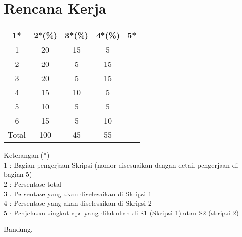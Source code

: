 \documentclass[a4paper,twoside]{article}
\begin{document}
\section{Rencana Kerja}
\begin{center}
  \begin{tabular}{ | c | c | c | c | l |}
    \hline
    1*  & 2*(\%) & 3*(\%) & 4*(\%) &5*\\ \hline \hline
    1   & 20 & 15 & 5  & {\footnotesize } \\ \hline
    2   & 20 & 5  & 15 & {\footnotesize } \\ \hline
    3   & 20 & 5  & 15 & {\footnotesize } \\ \hline
    4   & 15 & 10 & 5  & {\footnotesize } \\ \hline
    5   & 10 & 5  & 5  & {\footnotesize } \\ \hline
    6   & 15 & 5  & 10 & {\footnotesize } \\ \hline
    Total  & 100  & 45 & 55 &  \\ \hline
                          \end{tabular}
\end{center}

Keterangan (*)\\
1 : Bagian pengerjaan Skripsi (nomor disesuaikan dengan detail pengerjaan di bagian 5)\\
2 : Persentase total \\
3 : Persentase yang akan diselesaikan di Skripsi 1 \\
4 : Persentase yang akan diselesaikan di Skripsi 2 \\
5 : Penjelasan singkat apa yang dilakukan di S1 (Skripsi 1) atau S2 (skripsi 2)

\vspace{1cm}
\centering Bandung, \tanggal\\
\vspace{2cm} \nama \\ 
\vspace{1cm}
\end{document}
